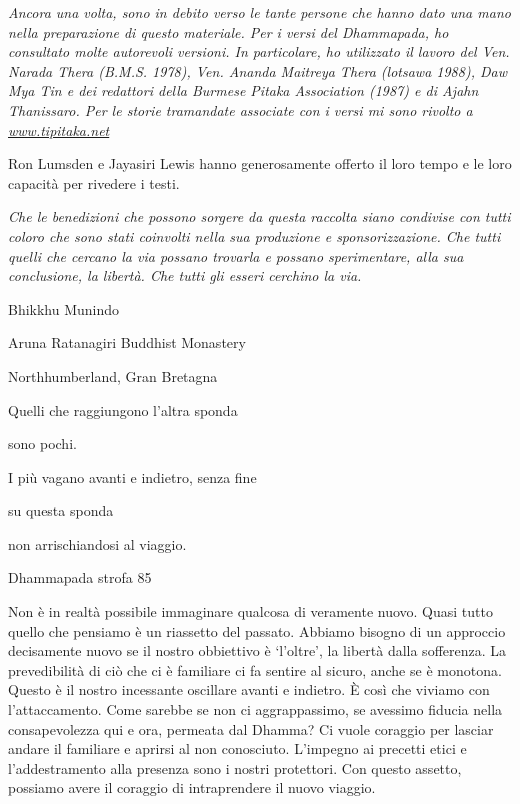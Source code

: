 \documentclass[a4paper,portrait,12pt]{article}
\begin{document}
\emph{   Ancora una volta, sono in debito verso le tante persone che hanno dato una mano nella preparazione di questo materiale. Per i versi del Dhammapada, ho consultato molte autorevoli versioni. In particolare, ho utilizzato il lavoro del Ven. Narada Thera (B.M.S. 1978), Ven. Ananda Maitreya Thera (lotsawa 1988), Daw Mya Tin e dei redattori della Burmese Pitaka Association (1987) e di Ajahn Thanissaro. Per le storie tramandate associate con i versi mi sono rivolto  a }\href{http://www.tipitaka.net/}{\emph{www.tipitaka.net}}


Ron Lumsden e Jayasiri Lewis hanno generosamente offerto il loro tempo e le loro capacit\`{a} per rivedere i testi.


\emph{    Che le benedizioni che possono sorgere da questa raccolta siano condivise con tutti coloro che sono stati coinvolti nella sua produzione e sponsorizzazione. Che tutti quelli che cercano la via possano trovarla e possano sperimentare, alla sua conclusione, la libert\`{a}. Che tutti gli esseri cerchino la via.}





Bhikkhu Munindo


Aruna Ratanagiri Buddhist Monastery


Northhumberland, Gran Bretagna


\newpage



Quelli che raggiungono l'altra sponda


sono pochi.


I più vagano avanti e indietro, senza fine


su questa sponda


non arrischiandosi al viaggio. 





Dhammapada strofa 85


\newpage



Non \`{e} in realt\`{a} possibile immaginare qualcosa di veramente nuovo. Quasi tutto quello che pensiamo \`{e} un riassetto del passato. Abbiamo bisogno di un approccio decisamente nuovo se il nostro obbiettivo \`{e} `l'oltre', la libert\`{a} dalla sofferenza. La prevedibilit\`{a} di ci\`{o} che ci \`{e} familiare ci fa sentire al sicuro, anche se \`{e} monotona. Questo \`{e} il nostro incessante oscillare avanti e indietro. \`{E} così che viviamo con l'attaccamento. Come sarebbe se non ci aggrappassimo, se avessimo fiducia nella consapevolezza qui e ora, permeata dal Dhamma? Ci vuole coraggio per lasciar andare il familiare e aprirsi al non conosciuto. L'impegno ai precetti etici e l'addestramento alla presenza sono i nostri protettori. Con questo assetto, possiamo avere il coraggio di intraprendere il nuovo viaggio.
\end{document}
